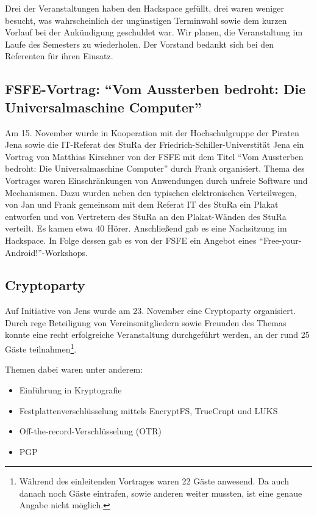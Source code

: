\documentclass[10pt,DIV16]{scrartcl}
\begin{document}
Drei der Veranstaltungen haben den Hackspace gefüllt, drei waren weniger
besucht, was wahrscheinlich der ungünstigen Terminwahl sowie dem kurzen
Vorlauf bei der Ankündigung geschuldet war.  Wir planen, die Veranstaltung im
Laufe des Semesters zu wiederholen.  Der Vorstand bedankt sich bei den
Referenten für ihren Einsatz.

\subsection{FSFE-Vortrag: "`Vom Aussterben bedroht: Die Universalmaschine Computer"'}
\label{sec:fsfevortrag}

Am 15. November wurde in Kooperation mit der Hochschulgruppe der 
Piraten Jena sowie die IT-Referat des StuRa der 
Friedrich-Schiller-Universtität Jena ein Vortrag von Matthias 
Kirschner von der FSFE mit dem Titel "`Vom Aussterben bedroht: Die 
Universalmaschine Computer"' durch Frank organisiert.  Thema des 
Vortrages waren Einschränkungen von Anwendungen durch unfreie
Software und Mechanismen. Dazu wurden neben den typischen 
elektronischen Verteilwegen, von Jan und Frank gemeinsam mit dem 
Referat IT des StuRa ein Plakat entworfen und von Vertretern des 
StuRa an den Plakat-Wänden des StuRa verteilt. Es kamen etwa 40 
Hörer. Anschließend gab es eine Nachsitzung im Hackspace. In Folge 
dessen gab es von der FSFE ein Angebot eines 
"`Free-your-Android!"'-Workshops.


\subsection{Cryptoparty}

Auf Initiative von Jens wurde am 23. November eine Cryptoparty organisiert.
Durch rege Beteiligung von Vereinsmitgliedern sowie Freunden des Themas konnte
eine recht erfolgreiche Veranstaltung durchgeführt werden, an der rund 25
Gäste teilnahmen\footnote{Während des einleitenden Vortrages waren 22 Gäste
anwesend. Da auch danach noch Gäste eintrafen, sowie anderen weiter mussten,
ist eine genaue Angabe nicht möglich.}.

Themen dabei waren unter anderem: 

\begin{itemize}
	\item Einführung in Kryptografie
	\item Festplattenverschlüsselung mittels EncryptFS, TrueCrupt und LUKS
	\item Off-the-record-Verschlüsselung (OTR)
	\item PGP
\end{itemize}
\end{document}

